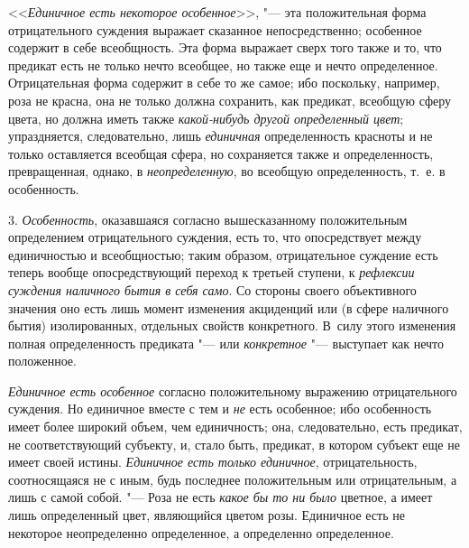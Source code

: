 <<{\em Единичное есть некоторое
особенное}>>, "--- эта положительная форма отрицательного
суждения выражает сказанное непосредственно; особенное содержит в себе
всеобщность. Эта форма выражает сверх того также и то, что предикат есть не
только нечто всеобщее, но также еще и нечто определенное. Отрицательная
форма содержит в себе то же самое; ибо поскольку, например, роза не красна,
она не только должна сохранить, как предикат, всеобщую сферу цвета, но
должна иметь также {\em какой-нибудь
другой определенный цвет}; упраздняется, следовательно, лишь
{\em единичная}
определенность красноты и не только оставляется всеобщая
сфера, но сохраняется также и определенность, превращенная, однако, в
{\em неопределенную}, во
всеобщую определенность, т.~е. в особенность.

3. {\em Особенность},
оказавшаяся согласно вышесказанному положительным
определением отрицательного суждения, есть то, что опосредствует между
единичностью и всеобщностью; таким образом, отрицательное суждение есть
теперь вообще опосредствующий переход к третьей ступени, к
{\em рефлексии суждения наличного бытия
в себя само}. Со стороны своего объективного значения оно
есть лишь момент изменения акциденций или (в сфере наличного бытия)
изолированных, отдельных свойств конкретного. В~силу этого изменения полная
определенность предиката "--- или
{\em конкретное}
"--- выступает как нечто положенное.

{\em Единичное есть особенное}
согласно положительному выражению отрицательного суждения. Но
единичное вместе с тем и {\em не}
есть особенное; ибо особенность имеет более широкий объем,
чем единичность; она, следовательно, есть предикат, не соответствующий
субъекту, и, стало быть, предикат, в котором субъект еще не имеет своей
истины. {\em Единичное есть только
единичное}, отрицательность, соотносящаяся не с иным, будь
последнее положительным или отрицательным, а лишь с самой собой. "---
Роза не есть {\em какое бы
то ни было} цветное, а имеет лишь определенный цвет,
являющийся цветом розы. Единичное есть не некоторое неопределенно
определенное, а определенно определенное.

